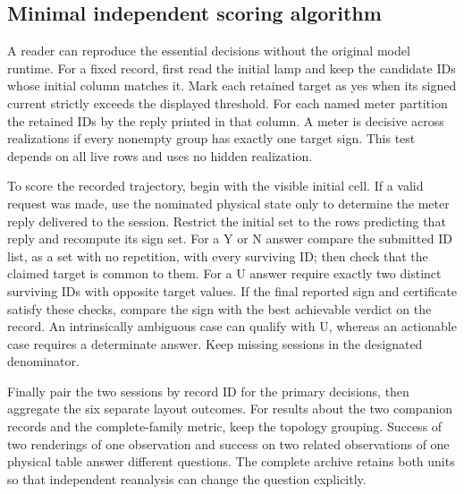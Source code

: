 \documentclass[12pt,letterpaper]{article}
\begin{document}
\subsection*{Minimal independent scoring algorithm}
A reader can reproduce the essential decisions without the original model runtime. For a fixed record, first read the initial lamp and keep the candidate IDs whose initial column matches it. Mark each retained target as yes when its signed current strictly exceeds the displayed threshold. For each named meter partition the retained IDs by the reply printed in that column. A meter is decisive across realizations if every nonempty group has exactly one target sign. This test depends on all live rows and uses no hidden realization.

To score the recorded trajectory, begin with the visible initial cell. If a valid request was made, use the nominated physical state only to determine the meter reply delivered to the session. Restrict the initial set to the rows predicting that reply and recompute its sign set. For a Y or N answer compare the submitted ID list, as a set with no repetition, with every surviving ID; then check that the claimed target is common to them. For a U answer require exactly two distinct surviving IDs with opposite target values. If the final reported sign and certificate satisfy these checks, compare the sign with the best achievable verdict on the record. An intrinsically ambiguous case can qualify with U, whereas an actionable case requires a determinate answer. Keep missing sessions in the designated denominator.

Finally pair the two sessions by record ID for the primary decisions, then aggregate the six separate layout outcomes. For results about the two companion records and the complete-family metric, keep the topology grouping. Success of two renderings of one observation and success on two related observations of one physical table answer different questions. The complete archive retains both units so that independent reanalysis can change the question explicitly.
\end{document}
